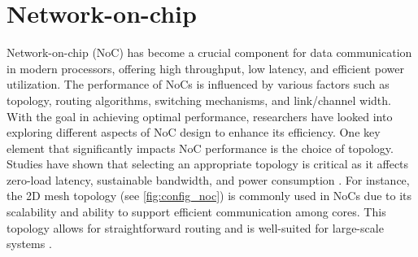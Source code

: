 \section{Network-on-chip}
Network-on-chip (NoC) has become a crucial component for data communication in modern processors, offering high throughput, low latency, and efficient power utilization.
The performance of NoCs is influenced by various factors such as topology, routing algorithms, switching mechanisms, and link/channel width.
With the goal in achieving optimal performance, researchers have looked into exploring different aspects of NoC design to enhance its efficiency.
One key element that significantly impacts NoC performance is the choice of topology.
Studies have shown that selecting an appropriate topology is critical as it affects zero-load latency, sustainable bandwidth, and power consumption \cite{chenPhysicalVsVirtual2010}.
For instance, the 2D mesh topology (see \cref{fig:config_noc}) is commonly used in NoCs due to its scalability and ability to support efficient communication among cores.
This topology allows for straightforward routing and is well-suited for large-scale systems \cite{sanchezAnalysisOnchipInterconnection2010}. 



